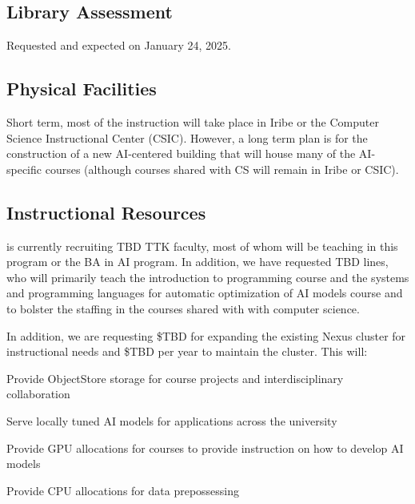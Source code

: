 
\newcommand{\ptkfaculty}{TBD}
\newcommand{\ttkfaculty}{TBD}
\newcommand{\advisors}{TBD}
\newcommand{\admin}{TBD}
\newcommand{\cloud}{TBD}
\newcommand{\upfrontcluster}{TBD}
\newcommand{\continuingcluster}{TBD}

\subsection{Library Assessment}

Requested and expected on January 24, 2025.

\subsection{Physical Facilities}

Short term, most of the instruction will take place in Iribe or the Computer Science Instructional Center (CSIC).  However, a long term plan is for the construction of a new AI-centered building that will house many of the AI-specific courses (although courses shared with CS will remain in Iribe or CSIC).

\subsection{Instructional Resources}

\aim{} is currently recruiting \ttkfaculty{} TTK faculty, most of whom will be teaching in this program or the BA in AI program.  In addition, we have requested \ptkfaculty{} lines, who will primarily teach the introduction to programming course and the systems and programming languages for automatic optimization of AI models course and to bolster the staffing in the courses shared with with computer science.

In addition, we are requesting \$\upfrontcluster{} for expanding the existing Nexus cluster for instructional needs and \$\continuingcluster{} per year to maintain the cluster.  This will:
\begin{itemize*}
    \item Provide ObjectStore storage for course projects and interdisciplinary collaboration
    \item Serve locally tuned AI models for applications across the university
    \item Provide GPU allocations for courses to provide instruction on how to develop AI models
    \item Provide CPU allocations for data prepossessing
\end{itemize*}

